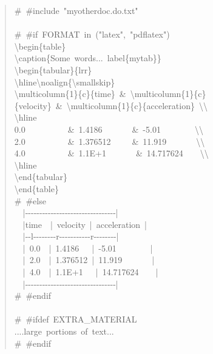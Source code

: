\documentclass[a4paper]{article}
\begin{document}
\begin{quote}{\ttfamily \raggedright \noindent
\#~\#include~"myotherdoc.do.txt"\\
~\\
\#~\#if~FORMAT~in~("latex",~"pdflatex")\\
\textbackslash{}begin\{table\}\\
\textbackslash{}caption\{Some~words...~label\{mytab\}\}\\
\textbackslash{}begin\{tabular\}\{lrr\}\\
\textbackslash{}hline\textbackslash{}noalign\{\textbackslash{}smallskip\}\\
\textbackslash{}multicolumn\{1\}\{c\}\{time\}~\&~\textbackslash{}multicolumn\{1\}\{c\}\{velocity\}~\&~\textbackslash{}multicolumn\{1\}\{c\}\{acceleration\}~\textbackslash{}\textbackslash{}\\
\textbackslash{}hline\\
0.0~~~~~~~~~~\&~1.4186~~~~~~~\&~-5.01~~~~~~~~\textbackslash{}\textbackslash{}\\
2.0~~~~~~~~~~\&~1.376512~~~~~\&~11.919~~~~~~~\textbackslash{}\textbackslash{}\\
4.0~~~~~~~~~~\&~1.1E+1~~~~~~~\&~14.717624~~~~\textbackslash{}\textbackslash{}\\
\textbackslash{}hline\\
\textbackslash{}end\{tabular\}\\
\textbackslash{}end\{table\}\\
\#~\#else\\
~~|-{}-{}-{}-{}-{}-{}-{}-{}-{}-{}-{}-{}-{}-{}-{}-{}-{}-{}-{}-{}-{}-{}-{}-{}-{}-{}-{}-{}-{}-{}-{}-|\\
~~|time~~|~velocity~|~acceleration~|\\
~~|-{}-l-{}-{}-{}-{}-{}-{}-{}-r-{}-{}-{}-{}-{}-{}-{}-{}-{}-{}-r-{}-{}-{}-{}-{}-{}-{}-|\\
~~|~0.0~~|~1.4186~~~|~-5.01~~~~~~~~|\\
~~|~2.0~~|~1.376512~|~11.919~~~~~~~|\\
~~|~4.0~~|~1.1E+1~~~|~14.717624~~~~|\\
~~|-{}-{}-{}-{}-{}-{}-{}-{}-{}-{}-{}-{}-{}-{}-{}-{}-{}-{}-{}-{}-{}-{}-{}-{}-{}-{}-{}-{}-{}-{}-{}-|\\
\#~\#endif\\
~\\
\#~\#ifdef~EXTRA\_MATERIAL\\
....large~portions~of~text...\\
\#~\#endif
}
\end{quote}
\end{document}
